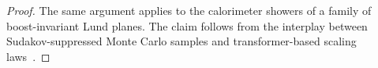 \begin{proof}
The same argument applies to the calorimeter showers of a family of
boost-invariant Lund planes. The claim follows from the interplay
between Sudakov-suppressed Monte Carlo samples and transformer-based
scaling
laws~\cite{TPC:2354-The-Uniqueness-of-the-Loss-Landscape-September-30-2026}.
\end{proof}

